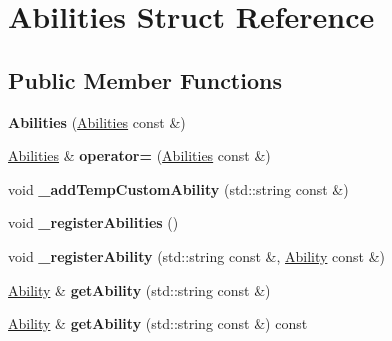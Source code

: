 \hypertarget{struct_abilities}{}\section{Abilities Struct Reference}
\label{struct_abilities}
\subsection*{Public Member Functions}
\begin{DoxyCompactItemize}
\item 
\mbox{\label{struct_abilities_aa931bdba431cf26909332a1cf2623a67}} 
{\bfseries Abilities} (\mbox{\hyperlink{struct_abilities}{Abilities}} const \&)
\item 
\mbox{\label{struct_abilities_a0c2af3d2deb7db5f23f54069629202eb}} 
\mbox{\hyperlink{struct_abilities}{Abilities}} \& {\bfseries operator=} (\mbox{\hyperlink{struct_abilities}{Abilities}} const \&)
\item 
\mbox{\label{struct_abilities_a52dbc2c4cfa4e2fb1a7d58b270048a69}} 
void {\bfseries \+\_\+add\+Temp\+Custom\+Ability} (std\+::string const \&)
\item 
\mbox{\label{struct_abilities_a72c7d4644a92afabcda005673c6c5f82}} 
void {\bfseries \+\_\+register\+Abilities} ()
\item 
\mbox{\label{struct_abilities_ab1a5c5e052fa6b75a968175583d602bd}} 
void {\bfseries \+\_\+register\+Ability} (std\+::string const \&, \mbox{\hyperlink{struct_ability}{Ability}} const \&)
\item 
\mbox{\label{struct_abilities_a65ca4637cf9a0b9ee4c0c1d98bfb06d8}} 
\mbox{\hyperlink{struct_ability}{Ability}} \& {\bfseries get\+Ability} (std\+::string const \&)
\item 
\mbox{\label{struct_abilities_a5caca3c604dd481ef2bd6907e0c6c3b0}} 
\mbox{\hyperlink{struct_ability}{Ability}} \& {\bfseries get\+Ability} (std\+::string const \&) const
\item 
\mbox{\label{struct_abilities_ab0acdd71e139371c0fa411aaef12e8ee}} 

\end{DoxyCompactItemize}
